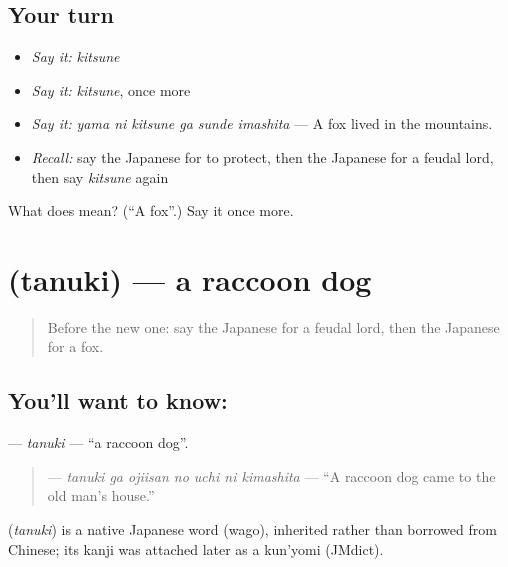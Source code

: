 \subsection*{Your turn}
\begin{itemize}
\raggedright
  \item \emph{Say it:} \emph{kitsune}
  \item \emph{Say it:} \emph{kitsune}, once more
  \item \emph{Say it:} \emph{yama ni kitsune ga sunde imashita} — A fox lived in the mountains.
  \item \emph{Recall:} say the Japanese for to protect, then the Japanese for a feudal lord, then say \emph{kitsune} again
\end{itemize}

\begin{tcolorbox}[breakable,colback=teal!4,colframe=teal!35!black,title={Before you move on}]
What does  mean? (\textquotedblleft{}A fox\textquotedblright{}.) Say it once more.
\end{tcolorbox}
\section[\texorpdfstring{\ja{たぬき} (tanuki)}{たぬき (tanuki)}]{ (tanuki) — a raccoon dog}

\label{lesson:JA-C300-tanuki}



\begin{quote}
Before the new one: say the Japanese for a feudal lord, then the Japanese for a fox.
\end{quote}

\subsection*{You'll want to know: }
\textbf{} — \emph{tanuki} — \textquotedblleft{}a raccoon dog\textquotedblright{}.

\begin{quote}
\textbf{   } — \emph{tanuki ga ojiisan no uchi ni kimashita} — \textquotedblleft{}A raccoon dog came to the old man's house.\textquotedblright{}
\end{quote}

\begin{cousinweb}
\textbf{} (\emph{tanuki}) is a native Japanese word (wago), inherited rather than borrowed from Chinese; its kanji was attached later as a kun'yomi (JMdict).
\end{cousinweb}

